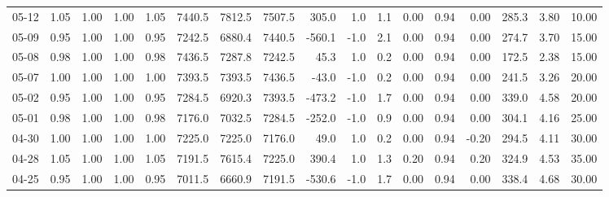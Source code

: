 \begin{threeparttable}
{\begin{tabular}{lrrrrrrrrrrrrrrrr}
  05-12 &         1.05 &           1.00 &          1.00 &          1.05 & 7440.5 & 7812.5 & 7507.5 &      305.0 &                      1.0 &                 1.1 &       0.00 &      0.94 &           0.00 &            285.3 &            3.80 &                  10.00 \\
  05-09 &         0.95 &           1.00 &          1.00 &          0.95 & 7242.5 & 6880.4 & 7440.5 &     -560.1 &                     -1.0 &                 2.1 &       0.00 &      0.94 &           0.00 &            274.7 &            3.70 &                  15.00 \\
  05-08 &         0.98 &           1.00 &          1.00 &          0.98 & 7436.5 & 7287.8 & 7242.5 &       45.3 &                      1.0 &                 0.2 &       0.00 &      0.94 &           0.00 &            172.5 &            2.38 &                  15.00 \\
  05-07 &         1.00 &           1.00 &          1.00 &          1.00 & 7393.5 & 7393.5 & 7436.5 &      -43.0 &                     -1.0 &                 0.2 &       0.00 &      0.94 &           0.00 &            241.5 &            3.26 &                  20.00 \\
  05-02 &         0.95 &           1.00 &          1.00 &          0.95 & 7284.5 & 6920.3 & 7393.5 &     -473.2 &                     -1.0 &                 1.7 &       0.00 &      0.94 &           0.00 &            339.0 &            4.58 &                  20.00 \\
  05-01 &         0.98 &           1.00 &          1.00 &          0.98 & 7176.0 & 7032.5 & 7284.5 &     -252.0 &                     -1.0 &                 0.9 &       0.00 &      0.94 &           0.00 &            304.1 &            4.16 &                  25.00 \\
  04-30 &         1.00 &           1.00 &          1.00 &          1.00 & 7225.0 & 7225.0 & 7176.0 &       49.0 &                      1.0 &                 0.2 &       0.00 &      0.94 &          -0.20 &            294.5 &            4.11 &                  30.00 \\
  04-28 &         1.05 &           1.00 &          1.00 &          1.05 & 7191.5 & 7615.4 & 7225.0 &      390.4 &                      1.0 &                 1.3 &       0.20 &      0.94 &           0.20 &            324.9 &            4.53 &                  35.00 \\
  04-25 &         0.95 &           1.00 &          1.00 &          0.95 & 7011.5 & 6660.9 & 7191.5 &     -530.6 &                     -1.0 &                 1.7 &       0.00 &      0.94 &           0.00 &            338.4 &            4.68 &                  30.00 \\

\end{tabular}}
\end{threeparttable}
